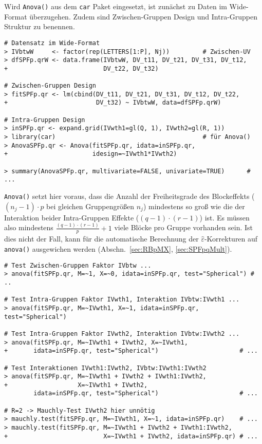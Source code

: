 Wird \lstinline!Anova()! aus dem \lstinline!car! Paket eingesetzt, ist zunächst zu Daten im Wide-Format überzugehen. Zudem sind Zwischen-Gruppen Design und Intra-Gruppen Struktur zu benennen.
\begin{lstlisting}
# Datensatz im Wide-Format
> IVbtwW     <- factor(rep(LETTERS[1:P], Nj))         # Zwischen-UV
> dfSPFp.qrW <- data.frame(IVbtwW, DV_t11, DV_t21, DV_t31, DV_t12,
+                          DV_t22, DV_t32)

# Zwischen-Gruppen Design
> fitSPFp.qr <- lm(cbind(DV_t11, DV_t21, DV_t31, DV_t12, DV_t22,
+                        DV_t32) ~ IVbtwW, data=dfSPFp.qrW)

# Intra-Gruppen Design
> inSPFp.qr <- expand.grid(IVwth1=gl(Q, 1), IVwth2=gl(R, 1))
> library(car)                                        # für Anova()
> AnovaSPFp.qr <- Anova(fitSPFp.qr, idata=inSPFp.qr,
+                       idesign=~IVwth1*IVwth2)

> summary(AnovaSPFp.qr, multivariate=FALSE, univariate=TRUE)      # ...
\end{lstlisting}

\lstinline!Anova()! setzt hier voraus, dass die Anzahl der Freiheitsgrade des Blockeffekts ($(n_{j}-1) \cdot p$ bei gleichen Gruppengrößen $n_{j}$) mindestens so groß wie die der Interaktion beider Intra-Gruppen Effekte ($(q-1) \cdot (r-1)$) ist. Es müssen also mindestens $\frac{(q-1) \cdot (r-1)}{p} + 1$ viele Blöcke pro Gruppe vorhanden sein. Ist dies nicht der Fall, kann für die automatische Berechnung der $\hat{\varepsilon}$-Korrekturen auf \lstinline!anova()! ausgewichen werden (Abschn.\ \ref{sec:RBpMX}, \ref{sec:SPFpqMult}).
\begin{lstlisting}
# Test Zwischen-Gruppen Faktor IVbtw ...
> anova(fitSPFp.qr, M=~1, X=~0, idata=inSPFp.qr, test="Spherical") # ..

# Test Intra-Gruppen Faktor IVwth1, Interaktion IVbtw:IVwth1 ...
> anova(fitSPFp.qr, M=~IVwth1, X=~1, idata=inSPFp.qr, test="Spherical")

# Test Intra-Gruppen Faktor IVwth2, Interaktion IVbtw:IVwth2 ...
> anova(fitSPFp.qr, M=~IVwth1 + IVwth2, X=~IVwth1,
+       idata=inSPFp.qr, test="Spherical")                      # ...

# Test Interaktionen IVwth1:IVwth2, IVbtw:IVwth1:IVwth2
> anova(fitSPFp.qr, M=~IVwth1 + IVwth2 + IVwth1:IVwth2,
+                   X=~IVwth1 + IVwth2,
        idata=inSPFp.qr, test="Spherical")                      # ...

# R=2 -> Mauchly-Test IVwth2 hier unnötig
> mauchly.test(fitSPFp.qr, M=~IVwth1, X=~1, idata=inSPFp.qr)    # ...
> mauchly.test(fitSPFp.qr, M=~IVwth1 + IVwth2 + IVwth1:IVwth2,
+                          X=~IVwth1 + IVwth2, idata=inSPFp.qr) # ...
\end{lstlisting}

